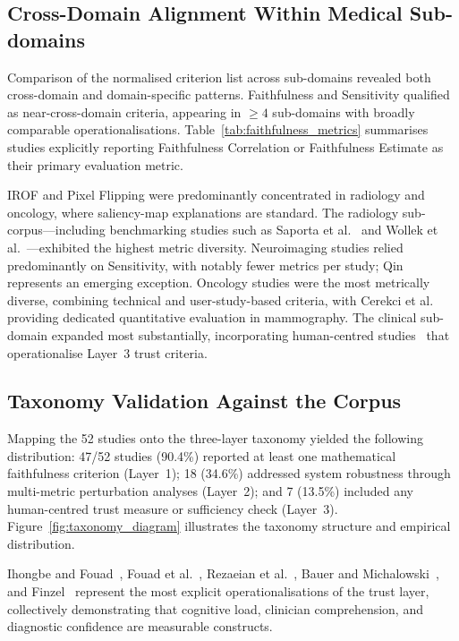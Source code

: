 \subsection{Cross-Domain Alignment Within Medical Sub-domains}

Comparison of the normalised criterion list across sub-domains revealed both cross-domain and domain-specific patterns. Faithfulness and Sensitivity qualified as near-cross-domain criteria, appearing in $\geq 4$ sub-domains with broadly comparable operationalisations. Table~\ref{tab:faithfulness_metrics} summarises studies explicitly reporting Faithfulness Correlation or Faithfulness Estimate as their primary evaluation metric.

IROF and Pixel Flipping were predominantly concentrated in radiology and oncology, where saliency-map explanations are standard. The radiology sub-corpus---including benchmarking studies such as Saporta et al.~\cite{saporta2022benchmarking} and Wollek et al.~\cite{wollek2023attention}---exhibited the highest metric diversity. Neuroimaging studies relied predominantly on Sensitivity, with notably fewer metrics per study; Qin~\cite{qin2025consistency} represents an emerging exception. Oncology studies were the most metrically diverse, combining technical and user-study-based criteria, with Cerekci et al.~\cite{cerekci2024quantitative} providing dedicated quantitative evaluation in mammography. The clinical sub-domain expanded most substantially, incorporating human-centred studies~\cite{rezaeian2026explainability,bauer2025human,finzel2024human} that operationalise Layer~3 trust criteria.



\subsection{Taxonomy Validation Against the Corpus}

Mapping the 52 studies onto the three-layer taxonomy yielded the following distribution: 47/52 studies (90.4\%) reported at least one mathematical faithfulness criterion (Layer~1); 18 (34.6\%) addressed system robustness through multi-metric perturbation analyses (Layer~2); and 7 (13.5\%) included any human-centred trust measure or sufficiency check (Layer~3). Figure~\ref{fig:taxonomy_diagram} illustrates the taxonomy structure and empirical distribution.

Ihongbe and Fouad~\cite{IhongbeFouad2024}, Fouad et al.~\cite{11355720}, Rezaeian et al.~\cite{rezaeian2026explainability}, Bauer and Michalowski~\cite{bauer2025human}, and Finzel~\cite{finzel2024human} represent the most explicit operationalisations of the trust layer, collectively demonstrating that cognitive load, clinician comprehension, and diagnostic confidence are measurable constructs.

